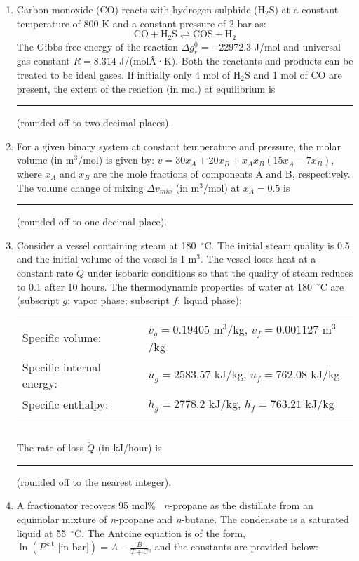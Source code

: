 \documentclass[12pt]{article}
\begin{document}
\begin{enumerate}[label=Q.\arabic*]
		\item Carbon monoxide (CO) reacts with hydrogen sulphide (H$_2$S) at a constant temperature of 800 K and a constant pressure of 2 bar as:
			\[\text{CO} + \text{H}_2\text{S} \rightleftharpoons \text{COS} + \text{H}_2\]
			The Gibbs free energy of the reaction $\Delta g_r^0 = -22972.3$ J/mol and universal gas constant $R = 8.314$ J/(molÂ·K). Both the reactants and products can be treated to be ideal gases. If initially only 4 mol of H$_2$S and 1 mol of CO are present, the extent of the reaction (in mol) at equilibrium is \rule{3cm}{0.15mm} (rounded off to two decimal places).

		\item For a given binary system at constant temperature and pressure, the molar volume (in m$^3$/mol) is given by: $v = 30x_A + 20x_B + x_A x_B (15x_A - 7x_B)$, where $x_A$ and $x_B$ are the mole fractions of components A and B, respectively. The volume change of mixing $\Delta v_{mix}$ (in m$^3$/mol) at $x_A = 0.5$ is \rule{3cm}{0.15mm} (rounded off to one decimal place).

		\item Consider a vessel containing steam at 180~$^\circ$C. The initial steam quality is 0.5 and the initial volume of the vessel is 1 m$^3$. The vessel loses heat at a constant rate $\dot{Q}$ under isobaric conditions so that the quality of steam reduces to 0.1 after 10 hours. The thermodynamic properties of water at 180~$^\circ$C are (subscript $g$: vapor phase; subscript $f$: liquid phase):
			\\
			\begin{tabular}{ll}
				Specific volume: & $v_g = 0.19405$ m$^3$/kg, $v_f = 0.001127$ m$^3$/kg \\
				Specific internal energy: & $u_g = 2583.57$ kJ/kg, $u_f = 762.08$ kJ/kg \\
				Specific enthalpy: & $h_g = 2778.2$ kJ/kg, $h_f = 763.21$ kJ/kg \\
			\end{tabular}
			\\
			The rate of loss $\dot{Q}$ (in kJ/hour) is \rule{3cm}{0.15mm} (rounded off to the nearest integer).

		\item A fractionator recovers 95 mol\% \, \emph{n}-propane as the distillate from an equimolar mixture of \emph{n}-propane and \emph{n}-butane. The condensate is a saturated liquid at 55~$^\circ$C. The Antoine equation is of the form, $\ln(P^{\text{sat}} \text{ [in bar]}) = A - \frac{B}{T + C}$, and the constants are provided below:


\end{enumerate}
\end{document}
